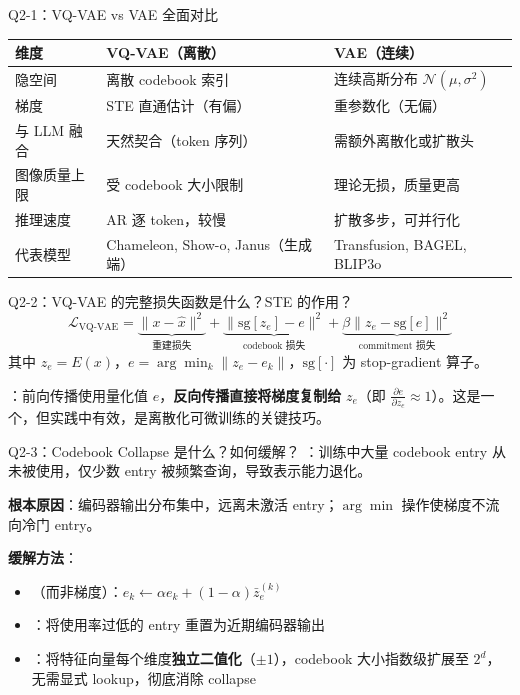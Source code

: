 \begin{conceptbox}{Q2-1：VQ-VAE vs VAE 全面对比}
\begin{center}
\small
\begin{tabular}{|l|l|l|}
\hline
\textbf{维度} & \textbf{VQ-VAE（离散）} & \textbf{VAE（连续）} \\
\hline
隐空间 & 离散 codebook 索引 & 连续高斯分布 $\mathcal{N}(\mu, \sigma^2)$ \\
梯度 & STE 直通估计（有偏） & 重参数化（无偏） \\
与 LLM 融合 & 天然契合（token 序列） & 需额外离散化或扩散头 \\
图像质量上限 & 受 codebook 大小限制 & 理论无损，质量更高 \\
推理速度 & AR 逐 token，较慢 & 扩散多步，可并行化 \\
代表模型 & Chameleon, Show-o, Janus（生成端） & Transfusion, BAGEL, BLIP3o \\
\hline
\end{tabular}
\end{center}
\end{conceptbox}

\begin{conceptbox}{Q2-2：VQ-VAE 的完整损失函数是什么？STE 的作用？}
\[
\mathcal{L}_{\text{VQ-VAE}} = \underbrace{\|x - \hat{x}\|^2}_{\text{重建损失}} + \underbrace{\|\text{sg}[z_e] - e\|^2}_{\text{codebook 损失}} + \underbrace{\beta \|z_e - \text{sg}[e]\|^2}_{\text{commitment 损失}}
\]
其中 $z_e = E(x)$，$e = \arg\min_k \|z_e - e_k\|$，$\text{sg}[\cdot]$ 为 stop-gradient 算子。

：前向传播使用量化值 $e$，\textbf{反向传播直接将梯度复制给} $z_e$（即 $\frac{\partial e}{\partial z_e} \approx 1$）。这是一个，但实践中有效，是离散化可微训练的关键技巧。
\end{conceptbox}

\begin{conceptbox}{Q2-3：Codebook Collapse 是什么？如何缓解？}
：训练中大量 codebook entry 从未被使用，仅少数 entry 被频繁查询，导致表示能力退化。

\textbf{根本原因}：编码器输出分布集中，远离未激活 entry；$\arg\min$ 操作使梯度不流向冷门 entry。

\textbf{缓解方法}：
\begin{itemize}
  \item {}（而非梯度）：$e_k \leftarrow \alpha e_k + (1-\alpha) \bar{z}_e^{(k)}$
  \item {}：将使用率过低的 entry 重置为近期编码器输出
  \item {}：将特征向量每个维度\textbf{独立二值化}（$\pm 1$），codebook 大小指数级扩展至 $2^d$，无需显式 lookup，彻底消除 collapse
\end{itemize}
\end{conceptbox}

